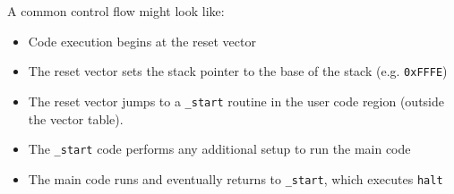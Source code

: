 \documentclass{article}
\begin{document}
A common control flow might look like:

\begin{itemize}
\item Code execution begins at the reset vector
\item The reset vector sets the stack pointer to the base of the stack (e.g. \verb|0xFFFE|)
\item The reset vector jumps to a \verb|_start| routine in the user code region (outside the
  vector table).
\item The \verb|_start| code performs any additional setup to run the main code
\item The main code runs and eventually returns to \verb|_start|, which executes \verb|halt|
\end{itemize}
\end{document}
